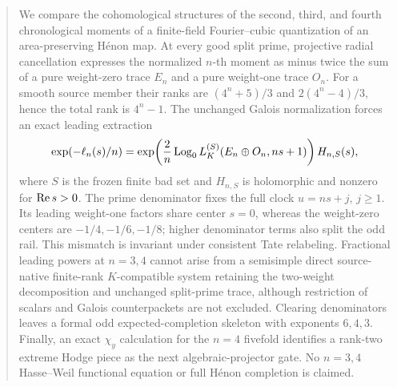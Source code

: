 \begin{abstract}
We compare the cohomological structures of the second, third, and fourth
chronological moments of a finite-field Fourier--cubic quantization of an
area-preserving H\'enon map.  At every good split prime, projective radial
cancellation expresses the normalized \(n\)-th moment as minus twice the
sum of a pure weight-zero trace \(E_n\) and a pure weight-one trace \(O_n\).
For a smooth source member their ranks are
\((4^n+5)/3\) and \(2(4^n-4)/3\), hence the total rank is \(4^n-1\).
The unchanged Galois normalization forces an exact leading extraction
\[
 \exp(-\ell_n(s)/n)
 =\exp\!\left(\frac{2}{n}\Logzero
 L_K^{(S)}(E_n\oplus O_n,ns+1)\right)H_{n,S}(s),
\]
where \(S\) is the frozen finite bad set and \(H_{n,S}\) is holomorphic
and nonzero for \(\RePart s>0\).
The prime denominator fixes the full clock \(u=ns+j\), \(j\ge1\).
Its leading weight-one factors share center \(s=0\), whereas the
weight-zero centers are \(-1/4,-1/6,-1/8\); higher denominator terms also
split the odd rail.  This mismatch is invariant under consistent Tate
relabeling.  Fractional leading powers at \(n=3,4\) cannot arise from a
semisimple direct source-native finite-rank \(K\)-compatible system
retaining the two-weight decomposition and unchanged split-prime trace,
although restriction of scalars and Galois
counterpackets are not excluded.  Clearing denominators leaves a formal
odd expected-completion skeleton with exponents \(6,4,3\).  Finally, an
exact \(\chi_y\) calculation for the \(n=4\) fivefold identifies a
rank-two extreme Hodge piece as the next algebraic-projector gate.  No
\(n=3,4\) Hasse--Weil functional equation or full H\'enon completion is
claimed.
\end{abstract}

